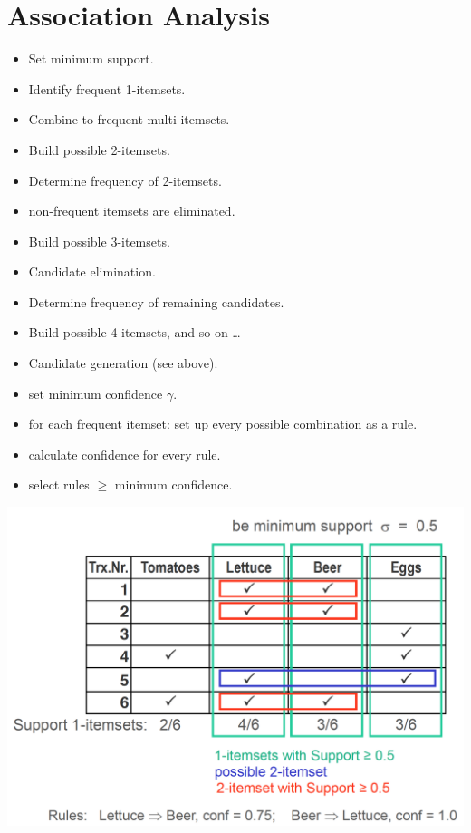 
\section{Association Analysis}

\begin{breakbox}
\begin{itemize}
	\item Set minimum support.
	\item Identify frequent 1-itemsets.
	\item Combine to frequent multi-itemsets.
	\item Build possible 2-itemsets.
	\item Determine frequency of 2-itemsets.
	\item non-frequent itemsets are eliminated.
	\item Build possible 3-itemsets.
	\item Candidate elimination.
	\item Determine frequency of remaining candidates.
	\item Build possible 4-itemsets, and so on \ldots
\end{itemize}
\end{breakbox}

\begin{breakbox}
\begin{itemize}
	\item Candidate generation (see above).
	\item set minimum confidence $\gamma$.
	\item for each frequent itemset: set up every possible combination as a rule.
	\item calculate confidence for every rule.
	\item select rules $\geq$ minimum confidence.
\end{itemize}
\begin{center}
\includegraphics[width=.15\textwidth]{slides_images/a-priori}
\end{center}
\end{breakbox}

